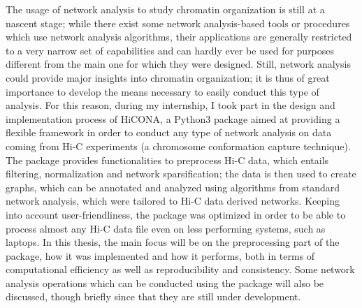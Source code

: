 The usage of network analysis to study chromatin organization is still at a nascent stage; while there exist some network analysis-based tools or procedures which use network analysis algorithms, their applications are generally restricted to a very narrow set of capabilities and can hardly ever be used for purposes different from the main one for which they were designed. Still, network analysis could provide major insights into chromatin organization; it is thus of great importance to develop the means necessary to easily conduct this type of analysis. For this reason, during my internship, I took part in the design and implementation process of HiCONA, a Python3 package aimed at providing a flexible framework in order to conduct any type of network analysis on data coming from Hi-C experiments (a chromosome conformation capture technique). The package provides functionalities to preprocess Hi-C data, which entails filtering, normalization and network sparsification; the data is then used to create graphs, which can be annotated and analyzed using algorithms from standard network analysis, which were tailored to Hi-C data derived networks. Keeping into account user-friendliness, the package was optimized in order to be able to process almost any Hi-C data file even on less performing systems, such as laptops. In this thesis, the main focus will be on the preprocessing part of the package, how it was implemented and how it performs, both in terms of computational efficiency as well as reproducibility and consistency. Some network analysis operations which can be conducted using the package will also be discussed, though briefly since that they are still under development.
